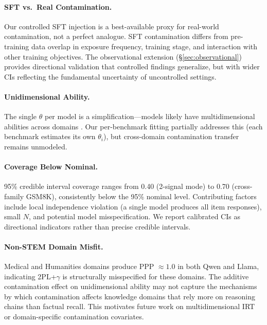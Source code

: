 \documentclass[11pt,a4paper]{article}
\begin{document}
\paragraph{SFT vs.\ Real Contamination.}
Our controlled SFT injection is a best-available proxy for real-world contamination, not a perfect analogue. SFT contamination differs from pre-training data overlap in exposure frequency, training stage, and interaction with other training objectives. The observational extension (\S\ref{sec:observational}) provides directional validation that controlled findings generalize, but with wider CIs reflecting the fundamental uncertainty of uncontrolled settings.

\paragraph{Unidimensional Ability.}
The single $\theta$ per model is a simplification---models likely have multidimensional abilities across domains \cite{reckase2009multidimensional,burnell2023rethink}. Our per-benchmark fitting partially addresses this (each benchmark estimates its own $\theta_i$), but cross-domain contamination transfer remains unmodeled.

\paragraph{Coverage Below Nominal.}
95\% credible interval coverage ranges from 0.40 (2-signal mode) to 0.70 (cross-family GSM8K), consistently below the 95\% nominal level. Contributing factors include local independence violation (a single model produces all item responses), small $N$, and potential model misspecification. We report calibrated CIs as directional indicators rather than precise credible intervals.

\paragraph{Non-STEM Domain Misfit.}
Medical and Humanities domains produce PPP $\approx 1.0$ in both Qwen and Llama, indicating 2PL+$\gamma$ is structurally misspecified for these domains. The additive contamination effect on unidimensional ability may not capture the mechanisms by which contamination affects knowledge domains that rely more on reasoning chains than factual recall. This motivates future work on multidimensional IRT \cite{reckase2009multidimensional} or domain-specific contamination covariates.
\end{document}
